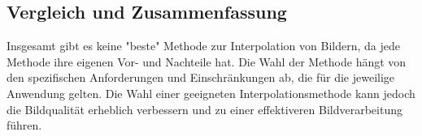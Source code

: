 \subsection{Vergleich und Zusammenfassung}

Insgesamt gibt es keine "beste" Methode zur Interpolation von Bildern, da jede Methode ihre eigenen Vor- und Nachteile hat. 
Die Wahl der Methode hängt von den spezifischen Anforderungen und Einschränkungen ab, die für die jeweilige Anwendung gelten. 
Die Wahl einer geeigneten Interpolationsmethode kann jedoch die Bildqualität erheblich verbessern und zu einer effektiveren Bildverarbeitung führen.
\newpage